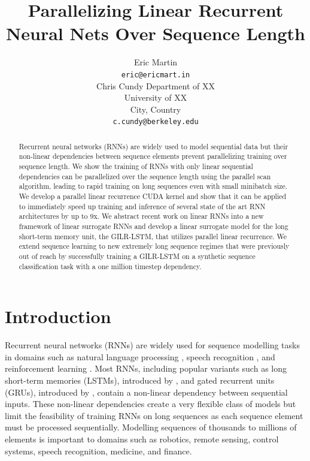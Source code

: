 \documentclass{article}
\title{Parallelizing Linear Recurrent Neural Nets Over Sequence Length}
\author{Eric Martin \\
\texttt{eric@ericmart.in} \\
\And
Chris Cundy
Department of XX \\
University of XX \\
City, Country \\
\texttt{c.cundy@berkeley.edu} \\
}
\begin{document}
\maketitle

\begin{abstract}
Recurrent neural networks (RNNs) are widely used to model sequential data but
their non-linear dependencies between sequence elements prevent parallelizing
training over sequence length. We show the training of RNNs with only linear
sequential dependencies can be parallelized over the sequence length using the
parallel scan algorithm, leading to rapid training on long sequences even with
small minibatch size. We develop a parallel linear recurrence CUDA kernel and
show that it can be applied to immediately speed up training and inference of
several state of the art RNN architectures by up to 9x.  We abstract recent work
on linear RNNs into a new framework of linear surrogate RNNs and develop a
linear surrogate model for the long short-term memory unit, the GILR-LSTM, that
utilizes parallel linear recurrence.  We extend sequence learning to new
extremely long sequence regimes that were previously out of reach by
successfully training a GILR-LSTM on a synthetic sequence classification task
with a one million timestep dependency.
\end{abstract}

\section{Introduction}
Recurrent neural networks (RNNs) are widely used for sequence modelling tasks in
domains such as natural language processing \citep{sutskever2014sequence},
speech recognition \citep{amodei2015deep}, and reinforcement learning
\citep{hausknecht2015deep}. Most RNNs, including popular variants such as long
short-term memories (LSTMs), introduced by \citet{hochreiter1997long}, and gated
recurrent units (GRUs), introduced by \citet{cho2014learning}, contain a non-linear dependency
between sequential inputs. These non-linear dependencies create a very flexible
class of models but limit the feasibility of training RNNs on long sequences as
each sequence element must be processed sequentially.  Modelling sequences of
thousands to millions of elements is important to domains such as robotics,
remote sensing, control systems, speech recognition, medicine, and finance.
\end{document}
